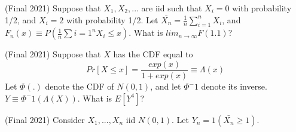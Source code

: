 \documentclass[answers]{exam}
\begin{document}
\begin{questions}

\question (Final 2021) Suppose that $X_1,X_2,...$ are iid such that $X_i = 0$ with probability 1/2, and $X_i = 2$ with probability 1/2. Let $\bar{X_n} = \frac{1}{n} \sum_{i=1}^n X_i$, and $F_n(x) \equiv P(\frac{1}{n}\sum{i=1}^n X_i \leq x)$. What is $lim_{n \to \infty} F(1.1)$?
\begin{solution}
\end{solution}

\question (Final 2021) Suppose that $X$ has the CDF equal to
$$Pr[X \leq x] = \frac{exp(x)}{1+exp(x)} \equiv \Lambda(x)$$
Let $\Phi(.)$ denote the CDF of $N(0,1)$, and let $\Phi^-1$ denote its inverse. $Y \equiv \Phi^-1(\Lambda(X))$. What is $E[Y^4]$?
\begin{solution}
\end{solution}

\question (Final 2021) Consider $X_1,...,X_n$ iid $N(0,1)$. Let $Y_n = 1(\bar{X_n}\geq 1)$.


\end{questions}
\end{document}
